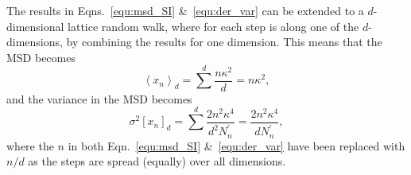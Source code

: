 \documentclass[reprint,superscriptaddress,nobibnotes,amsmath,amssymb,aps,prx,hidelinks]{revtex4-2}
\newcommand{\oMSDn}{\ensuremath{x_n}}
\newcommand{\moMSDn}{\ensuremath{\left<\oMSDn\right>}}
\newcommand{\nind}[1]{\ensuremath{N^\prime_{#1}}}
\newcommand{\var}[1]{\ensuremath{\sigma^2[#1]}}
\begin{document}
The results in Eqns.~\ref{equ:msd_SI} \&~\ref{equ:der_var} can be extended to a $d$-dimensional lattice random walk, where for each step is along one of the $d$-dimensions, by combining the results for one dimension. 
This means that the MSD becomes 
%
\begin{equation}
    \moMSDn_{d} = \sum^d{\frac{n\kappa^2}{d}} = n\kappa^2,
\end{equation}
%
and the variance in the MSD becomes
%
\begin{equation}
    \var{\oMSDn}_d = \sum^d{\frac{2n^2\kappa^4}{d^2\nind{n}}} = \frac{2n^2\kappa^4}{d\nind{n}},
\end{equation}
%
where the $n$ in both Eqn.~\ref{equ:msd_SI} \&~\ref{equ:der_var} have been replaced with $n/d$ as the steps are spread (equally) over all dimensions. 
\end{document}
